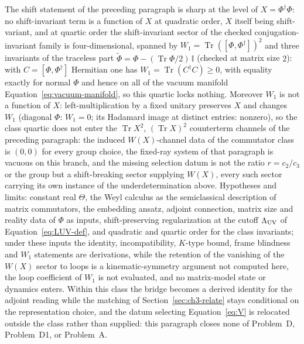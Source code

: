 The shift statement of the preceding paragraph is sharp at the level of \(X=\Phi^\dagger\Phi\): no shift-invariant term is a function of \(X\) at quadratic order, \(X\) itself being shift-variant, and at quartic order the shift-invariant sector of the checked conjugation-invariant family is four-dimensional, spanned by \(W_1=\operatorname{Tr}([\Phi,\Phi^\dagger])^2\) and three invariants of the traceless part \(\widetilde\Phi=\Phi-(\operatorname{Tr}\Phi/2)\,\mathbb I\) (checked at matrix size \(2\)): with \(C=[\Phi,\Phi^\dagger]\) Hermitian one has \(W_1=\operatorname{Tr}(C^\dagger C)\ge0\), with equality exactly for normal \(\Phi\) and hence on all of the vacuum manifold Equation~\eqref{eq:vacuum-manifold}, so this quartic locks nothing.
Moreover \(W_1\) is not a function of \(X\): left-multiplication by a fixed unitary preserves \(X\) and changes \(W_1\) (diagonal \(\Phi\): \(W_1=0\); its Hadamard image at distinct entries: nonzero), so the class quartic does not enter the \(\operatorname{Tr}X^2\), \((\operatorname{Tr}X)^2\) counterterm channels of the preceding paragraph: the induced \(W(X)\)-channel data of the commutator class is \((0,0)\) for every group choice, the fixed-ray system of that paragraph is vacuous on this branch, and the missing selection datum is not the ratio \(r=c_2/c_3\) or the group but a shift-breaking sector supplying \(W(X)\), every such sector carrying its own instance of the underdetermination above.
Hypotheses and limits: constant real \(\Theta\), the Weyl calculus as the semiclassical description of matrix commutators, the embedding ansatz, adjoint connection, matrix size and reality data of \(\Phi\) as inputs, shift-preserving regularization at the cutoff \(\Lambda_{\mathrm{UV}}\) of Equation~\eqref{eq:LUV-def}, and quadratic and quartic order for the class invariants; under these inputs the identity, incompatibility, \(K\)-type bound, frame blindness and \(W_1\) statements are derivations, while the retention of the vanishing of the \(W(X)\) sector to loops is a kinematic-symmetry argument not computed here, the loop coefficient of \(W_1\) is not evaluated, and no matrix-model state or dynamics enters.
Within this class the bridge becomes a derived identity for the adjoint reading while the matching of Section~\ref{sec:ch3-relate} stays conditional on the representation choice, and the datum selecting Equation~\eqref{eq:V} is relocated outside the class rather than supplied: this paragraph closes none of Problem~D, Problem~D1, or Problem~A.

